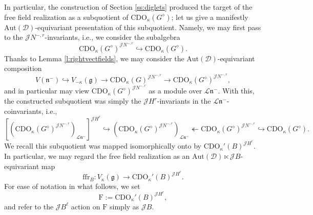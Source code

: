 \documentclass{amsart}
\theoremstyle{definition}
\newcommand{\diglet}{\mathrm{F}}
\newcommand{\sss}{\subsubsection{}}
\newcommand{\fg}{\mathfrak{g}}
\newcommand{\D}{\sD}
\newcommand{\sD}{\mathscr{D}}
\newcommand{\on}{\mathrm}
\newcommand{\ffr}{\mathrm{ffr}}
\newcommand{\Jet}{\mathscr{J}}
\newcommand{\Loop}{\mathscr{L}}
\newcommand{\CDO}{\mathrm{CDO}}
\newcommand{\Aut}{\on{Aut}}
\numberwithin{equation}{section}
\begin{document}
\sss In particular, the construction of Section \ref{ss:diglets} produced the target of the free field realization as a subquotient of $\CDO_\kappa(G^\diamond)$; let us give a manifestly $\Aut(\sD)$-equivariant presentation of this subquotient.  Namely, we may first pass to the $\Jet N^{-, r}$-invariants, i.e., we consider the subalgebra  
$$\CDO_\kappa(G^\diamond)^{\Jet N^{-, r}} \hookrightarrow \CDO_\kappa(G^\diamond).$$
Thanks to Lemma \ref{l:rightvectfields}, we may consider the $\Aut(\D)$-equivariant composition 
$$V(\mathfrak{n}^-) \hookrightarrow V_{-\kappa}(\fg) \rightarrow \CDO_\kappa(G)^{\Jet N^{-, r}} \rightarrow \CDO_\kappa(G^\diamond)^{\Jet N^{-, r}},$$
and in particular may view $\CDO_\kappa(G^\diamond)^{\Jet N^{-, r}}$ as a module over $\Loop \mathfrak{n}^-$. With this, the constructed subquotient was simply the $\Jet H^r$-invariants in  the $\Loop \mathfrak{n}^-$-coinvariants, i.e., 
$$[(\CDO_\kappa(G^\diamond)^{\Jet N^{-, r}})_{\Loop \mathfrak{n}^-}]^{\Jet H^r} \hookrightarrow  (\CDO_\kappa(G^\diamond)^{\Jet N^{-, r}})_{\Loop \mathfrak{n}^-} \twoheadleftarrow \CDO_\kappa(G^\diamond)^{\Jet N^{-, r}} \hookrightarrow \CDO_\kappa(G^\diamond).$$
We recall this subquotient was mapped isomorphically onto by $\CDO_\kappa'(B)^{\Jet H^r}$. In particular, we may regard the free field realization as an $\Aut(\sD) \ltimes \Jet B$-equivariant map 
$$\ffr_B: V_\kappa(\fg) \rightarrow \CDO_\kappa'(B)^{\Jet H^r}.$$
For ease of notation in what follows, we set 
$$\diglet := \CDO_\kappa'(B)^{\Jet H^r},$$and refer to the $\Jet B^\ell$ action on $\diglet$ simply as $\Jet B$.

























\end{document}
